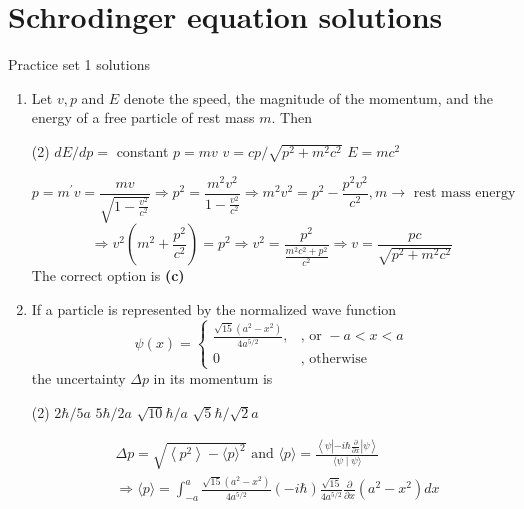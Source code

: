 \chapter{Schrodinger equation solutions}
\begin{abox}
	Practice set 1 solutions
	\end{abox}
\begin{enumerate}
	\item Let $v, p$ and $E$ denote the speed, the magnitude of the momentum, and the energy of a free particle of rest mass $m$. Then
	{}
\begin{tasks}(2)
	\task[\textbf{A.}] $d E / d p=$ constant
	\task[\textbf{B.}]$p=m v$
	\task[\textbf{C.}]$v=c p / \sqrt{p^{2}+m^{2} c^{2}}$
	\task[\textbf{D.}] $E=m c^{2}$
\end{tasks}
\begin{answer}
	$$p=m^{\prime} v=\frac{m v}{\sqrt{1-\frac{v^{2}}{c^{2}}}} \Rightarrow p^{2}=\frac{m^{2} v^{2}}{1-\frac{v^{2}}{c^{2}}} \Rightarrow m^{2} v^{2}=p^{2}-\frac{p^{2} v^{2}}{c^{2}}, m \rightarrow \text { rest mass energy }$$
	$$\Rightarrow v^{2}\left(m^{2}+\frac{p^{2}}{c^{2}}\right)=p^{2} \Rightarrow v^{2}=\frac{p^{2}}{\frac{m^{2} c^{2}+p^{2}}{c^{2}}} \Rightarrow v=\frac{p c}{\sqrt{p^{2}+m^{2} c^{2}}}$$
	The correct option is \textbf{(c)}
\end{answer}
\item If a particle is represented by the normalized wave function
$$
\psi(x)= \begin{cases}\frac{\sqrt{15}\left(a^{2}-x^{2}\right)}{4 a^{5 / 2}}, & \text {, or }-a<x<a \\ 0 & , \text { otherwise }\end{cases}
$$
the uncertainty $\Delta p$ in its momentum is
	{}
\begin{tasks}(2)
	\task[\textbf{A.}] $2 \hbar / 5 a$
	\task[\textbf{B.}] $5 \hbar / 2 a$
	\task[\textbf{C.}]$\sqrt{10} \hbar / a$
	\task[\textbf{D.}]$\sqrt{5} \hbar / \sqrt{2} a$
\end{tasks}
\begin{answer}
	\begin{align*}
	&\Delta p=\sqrt{\left\langle p^{2}\right\rangle-\langle p\rangle^{2}} \text { and }\langle p\rangle=\frac{\left\langle\psi\left|-i \hbar \frac{\partial}{\partial x}\right| \psi\right\rangle}{\langle\psi \mid \psi\rangle}\\
		&\Rightarrow\langle p\rangle=\int_{-a}^{a} \frac{\sqrt{15}\left(a^{2}-x^{2}\right)}{4 a^{5 / 2}}(-i \hbar) \frac{\sqrt{15}}{4 a^{5 / 2}} \frac{\partial}{\partial x}\left(a^{2}-x^{2}\right) d x \\

\end{align*}
\end{answer}
\end{enumerate}

